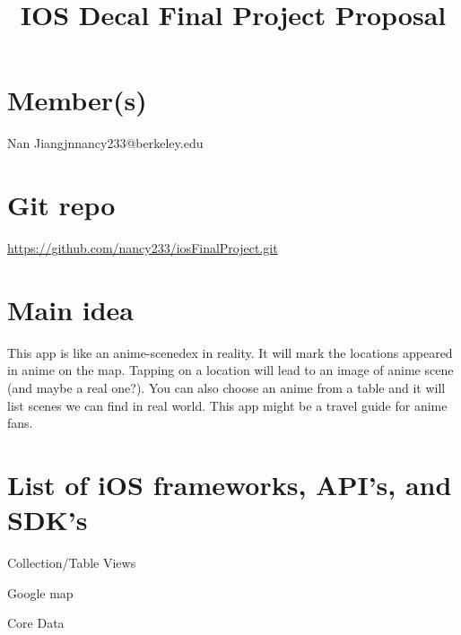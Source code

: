 \documentclass[11pt]{article}
\title{IOS Decal Final Project Proposal}
\date{}
\makeatletter
\def\Name{Nan Jiang}  %
\def\email{jnnancy233@berkeley.edu}  %
\makeatother
\begin{document}
\bfseries\maketitle
\section*{Member(s)}
\Name{\hspace*{1cm}}\email

\section*{Git repo}
\url{https://github.com/nancy233/iosFinalProject.git}

\section*{Main idea}
This app is like an anime-scenedex in reality. It will mark the locations appeared in anime on the map. Tapping on a location will lead to an image of anime scene (and maybe a real one?). You can also choose an anime from a table and it will list scenes we can find in real world. This app might be a travel guide for anime fans. 

\section*{List of iOS frameworks, API’s, and SDK’s}
Collection/Table Views

Google map

Core Data
\end{document}

